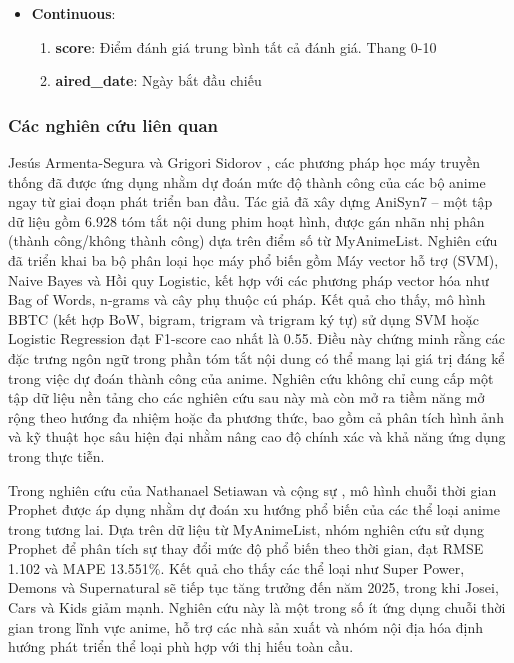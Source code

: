 \begin{itemize}
\begin{itemize}
\begin{enumerate}[resume]
                \end{enumerate}

            \item \textbf{Continuous}:

                \begin{enumerate}[resume]
                    \item \textbf{score}: Điểm đánh giá trung bình tất cả đánh giá. Thang 0-10

                    \item \textbf{aired\_date}: Ngày bắt đầu chiếu
                \end{enumerate}
        \end{itemize}
     
     \end{itemize}

\subsubsection{Các nghiên cứu liên quan}
    Jesús Armenta-Segura và Grigori Sidorov \cite{armenta2023anime}, các phương pháp học máy truyền thống đã được ứng dụng nhằm dự đoán mức độ thành công của các bộ anime ngay từ giai đoạn phát triển ban đầu. Tác giả đã xây dựng AniSyn7 – một tập dữ liệu gồm 6.928 tóm tắt nội dung phim hoạt hình, được gán nhãn nhị phân (thành công/không thành công) dựa trên điểm số từ MyAnimeList. Nghiên cứu đã triển khai ba bộ phân loại học máy phổ biến gồm Máy vector hỗ trợ (SVM), Naive Bayes và Hồi quy Logistic, kết hợp với các phương pháp vector hóa như Bag of Words, n-grams và cây phụ thuộc cú pháp. Kết quả cho thấy, mô hình BBTC (kết hợp BoW, bigram, trigram và trigram ký tự) sử dụng SVM hoặc Logistic Regression đạt F1-score cao nhất là 0.55. Điều này chứng minh rằng các đặc trưng ngôn ngữ trong phần tóm tắt nội dung có thể mang lại giá trị đáng kể trong việc dự đoán thành công của anime. Nghiên cứu không chỉ cung cấp một tập dữ liệu nền tảng cho các nghiên cứu sau này mà còn mở ra tiềm năng mở rộng theo hướng đa nhiệm hoặc đa phương thức, bao gồm cả phân tích hình ảnh và kỹ thuật học sâu hiện đại nhằm nâng cao độ chính xác và khả năng ứng dụng trong thực tiễn.

    Trong nghiên cứu của Nathanael Setiawan và cộng sự \cite{setiawan2023time}, mô hình chuỗi thời gian Prophet được áp dụng nhằm dự đoán xu hướng phổ biến của các thể loại anime trong tương lai. Dựa trên dữ liệu từ MyAnimeList, nhóm nghiên cứu sử dụng Prophet để phân tích sự thay đổi mức độ phổ biến theo thời gian, đạt RMSE 1.102 và MAPE 13.551\%. Kết quả cho thấy các thể loại như Super Power, Demons và Supernatural sẽ tiếp tục tăng trưởng đến năm 2025, trong khi Josei, Cars và Kids giảm mạnh. Nghiên cứu này là một trong số ít ứng dụng chuỗi thời gian trong lĩnh vực anime, hỗ trợ các nhà sản xuất và nhóm nội địa hóa định hướng phát triển thể loại phù hợp với thị hiếu toàn cầu.

